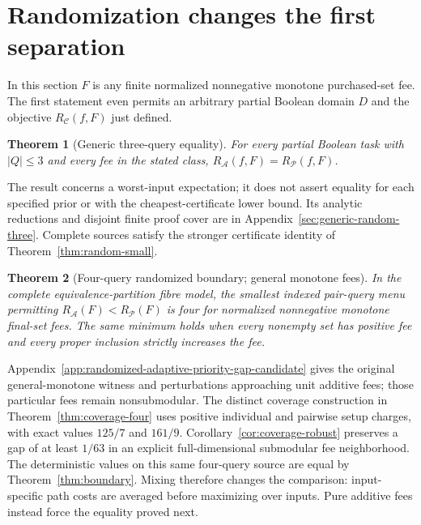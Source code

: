 \documentclass[pdflatex,sn-mathphys-num]{sn-jnl}
\theoremstyle{thmstyleone}
\newtheorem{theorem}{Theorem}
\theoremstyle{thmstylethree}
\theoremstyle{thmstyletwo}
\begin{document}
\section{Randomization changes the first separation}
\label{sec:randomized-core}
In this section $F$ is any finite normalized nonnegative monotone
purchased-set fee. The first statement even permits an arbitrary partial
Boolean domain $D$ and the objective $R_{\mathcal C}(f,F)$ just defined.

\begin{theorem}[Generic three-query equality]
\label{thm:generic-random-three}
For every partial Boolean task with $|Q|\leq3$ and every fee in the
stated class, $R_{\mathcal A}(f,F)=R_{\mathcal P}(f,F)$.
\end{theorem}

The result concerns a worst-input expectation; it does not assert
equality for each specified prior or with the cheapest-certificate
lower bound. Its analytic reductions and disjoint finite proof cover
are in Appendix~\ref{sec:generic-random-three}. Complete sources satisfy
the stronger certificate identity of Theorem~\ref{thm:random-small}.

\begin{theorem}[Four-query randomized boundary; general monotone fees]\label{thm:random-priority-four}
In the complete equivalence-partition fibre model, the smallest indexed
pair-query menu permitting $R_{\mathcal A}(F)<R_{\mathcal P}(F)$ is four
for normalized nonnegative monotone final-set fees. The same minimum
holds when every nonempty set has positive fee and every proper
inclusion strictly increases the fee.
\end{theorem}

Appendix~\ref{app:randomized-adaptive-priority-gap-candidate} gives
the original general-monotone witness and perturbations approaching unit
additive fees; those particular fees remain nonsubmodular. The distinct
coverage construction in Theorem~\ref{thm:coverage-four} uses positive
individual and pairwise setup charges, with exact values $125/7$ and
$161/9$. Corollary~\ref{cor:coverage-robust} preserves a gap of at least
$1/63$ in an explicit full-dimensional submodular fee neighborhood.
The deterministic values on this same four-query source are equal by
Theorem~\ref{thm:boundary}. Mixing therefore changes the comparison:
input-specific path costs are averaged before maximizing over inputs.
Pure additive fees instead force the equality proved next.
\end{document}
